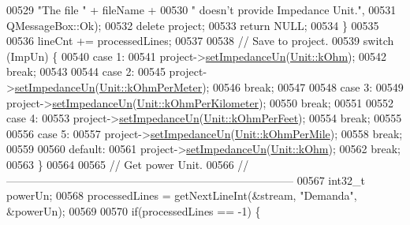 \begin{DoxyCode}
00529                           \textcolor{stringliteral}{"The file "} + fileName +
00530                           \textcolor{stringliteral}{" doesn't provide Impedance Unit."},
00531                           QMessageBox::Ok);
00532     \textcolor{keyword}{delete} project;
00533     \textcolor{keywordflow}{return} NULL;
00534   \}
00535 
00536   lineCnt += processedLines;
00537 
00538 \textcolor{comment}{// Save to project.}
00539   \textcolor{keywordflow}{switch} (ImpUn) \{
00540   \textcolor{keywordflow}{case} 1:
00541     project->\hyperlink{class_project_a995d050781923522ae2a02728346d199}{setImpedanceUn}(\hyperlink{class_unit_a3747e779c805df24a71961290be3fbdfa6b9c74d1763eefbaf751eeecff0bd9da}{Unit::kOhm});
00542     \textcolor{keywordflow}{break};
00543 
00544   \textcolor{keywordflow}{case} 2:
00545     project->\hyperlink{class_project_a995d050781923522ae2a02728346d199}{setImpedanceUn}(\hyperlink{class_unit_a3747e779c805df24a71961290be3fbdfa35e9ca44deb5a35fdb576111cf0db336}{Unit::kOhmPerMeter});
00546     \textcolor{keywordflow}{break};
00547 
00548   \textcolor{keywordflow}{case} 3:
00549     project->\hyperlink{class_project_a995d050781923522ae2a02728346d199}{setImpedanceUn}(\hyperlink{class_unit_a3747e779c805df24a71961290be3fbdfa56a0289d2ddeff7ca4aa8ba410df79d6}{Unit::kOhmPerKilometer});
00550     \textcolor{keywordflow}{break};
00551 
00552   \textcolor{keywordflow}{case} 4:
00553     project->\hyperlink{class_project_a995d050781923522ae2a02728346d199}{setImpedanceUn}(\hyperlink{class_unit_a3747e779c805df24a71961290be3fbdfa433b57934ca3be960ec7a60f3ea6ea87}{Unit::kOhmPerFeet});
00554     \textcolor{keywordflow}{break};
00555 
00556   \textcolor{keywordflow}{case} 5:
00557     project->\hyperlink{class_project_a995d050781923522ae2a02728346d199}{setImpedanceUn}(\hyperlink{class_unit_a3747e779c805df24a71961290be3fbdfa1d5bb04c9ecda66b09891af21cd4f613}{Unit::kOhmPerMile});
00558     \textcolor{keywordflow}{break};
00559 
00560   \textcolor{keywordflow}{default}:
00561     project->\hyperlink{class_project_a995d050781923522ae2a02728346d199}{setImpedanceUn}(\hyperlink{class_unit_a3747e779c805df24a71961290be3fbdfa6b9c74d1763eefbaf751eeecff0bd9da}{Unit::kOhm});
00562     \textcolor{keywordflow}{break};
00563   \}
00564 
00565 \textcolor{comment}{// Get power Unit.}
00566 \textcolor{comment}{//------------------------------------------------------------------------------}
00567   int32\_t powerUn;
00568   processedLines = getNextLineInt(&stream, \textcolor{stringliteral}{"Demanda"}, &powerUn);
00569 
00570   \textcolor{keywordflow}{if}(processedLines == -1) \{

\end{DoxyCode}
